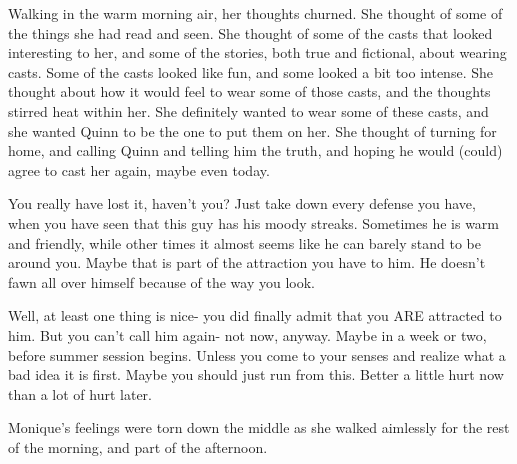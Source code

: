 Walking in the warm morning air, her thoughts churned. She thought of some of the things she
had read and seen. She thought of some of the casts that looked interesting to her, and some of
the stories, both true and fictional, about wearing casts. Some of the casts looked like fun,
and some looked a bit too intense. She thought about how it would feel to wear some of those
casts, and the thoughts stirred heat within her. She definitely wanted to wear some of these
casts, and she wanted Quinn to be the one to put them on her. She thought of turning for home,
and calling Quinn and telling him the truth, and hoping he would (could) agree to cast her
again, maybe even today.

You really have lost it, haven't you? Just take down every defense you have, when you have
seen that this guy has his moody streaks. Sometimes he is warm and friendly, while other times
it almost seems like he can barely stand to be around you. Maybe that is part of the attraction
you have to him. He doesn't fawn all over himself because of the way you look.

Well, at least one thing is nice- you did finally admit that you ARE attracted to him. But
you can't call him again- not now, anyway. Maybe in a week or two, before summer session begins.
Unless you come to your senses and realize what a bad idea it is first. Maybe you should just
run from this. Better a little hurt now than a lot of hurt later.

Monique's feelings were torn down the middle as she walked aimlessly for the rest of the
morning, and part of the afternoon.
